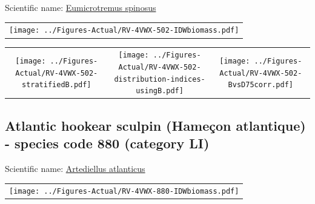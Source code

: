 \documentclass[12pt]{article}\usepackage[]{graphicx}\usepackage[]{color}
\begin{document}

Scientific name: \href{http://www.marinespecies.org/aphia.php?p=taxdetails\&id=127217}{Eumicrotremus spinosus} \newline
\begin{minipage}{1.0\textwidth}
 \begin{tabular}{c}
\texttt{[image: ../Figures-Actual/RV-4VWX-502-IDWbiomass.pdf]} \\ 
\end{tabular} 
\end{minipage}
\newline

\vspace{1cm}
\begin{minipage}{1.0\textwidth}
 \begin{tabular}{ccc}
\texttt{[image: ../Figures-Actual/RV-4VWX-502-stratifiedB.pdf]} & 
\texttt{[image: ../Figures-Actual/RV-4VWX-502-distribution-indices-usingB.pdf]} & 
\texttt{[image: ../Figures-Actual/RV-4VWX-502-BvsD75corr.pdf]} \\ 
\end{tabular} 
\end{minipage}
\clearpage

\renewcommand\thefigure{\thesubsection\Alph{figure}}

\setcounter{figure}{0}

\hypertarget{sec:880}{%
\subsection{Atlantic hookear sculpin (Hameçon atlantique) - species code 880 (category LI)}\label{sec:880}}

  


Scientific name: \href{http://www.marinespecies.org/aphia.php?p=taxdetails\&id=127193}{Artediellus atlanticus} \newline
\begin{minipage}{1.0\textwidth}
 \begin{tabular}{c}
\texttt{[image: ../Figures-Actual/RV-4VWX-880-IDWbiomass.pdf]} \\ 
\end{tabular} 
\end{minipage}
\newline
\end{document}
